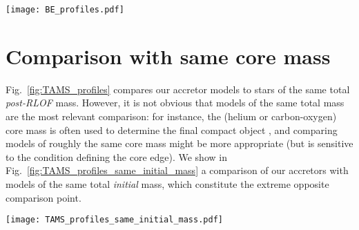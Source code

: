 \documentclass[twocolumn,twocolappendix,trackchanges]{aastex63}
\DeclareRobustCommand{\Figref}[1]{Fig.~\ref{#1}}
\begin{document}
\begin{figure*}[hbtp]
  \texttt{[image: BE\_profiles.pdf]}
  \caption{Binding energy profile at fixed photospheric radius $R$
    (right y-axis) as a function of radial coordinate $r$. We only
    show profiles with $\alpha_\mathrm{th}=1$, that is accounting for
    the internal energy content of the star. Orange, red, and other
    colors show respectively the accretor models, single stars of same
    post-RLOF total mass, and engineered models with varying CEB
    steepness (increasing CEB size from blue to
      yellow, cf.~\Figref{fig:TAMS_profiles}). Titles indicates the pre-RLOF and approximate
    post-RLOF accretor masses. The vertical colored lines mark the
    outer edge of the helium cores of the accretor and single star,
    that is the outermost location where $Y>0.1$ and $X<0.01$ (solid
    lines), or $X<0.1$ (dashed), or $X<0.2$ (dot-dashed). The dotted
    gray lines mark the total radius $R$ of these models.}
  \label{fig:BE_profiles}
\end{figure*}


\newpage
\section{Comparison with same core mass}
\label{sec:same_core}

\Figref{fig:TAMS_profiles} compares our accretor models to stars of
the same total \emph{post-RLOF} mass. However, it is not obvious that models
of the same total mass are the most relevant comparison: for instance,
the (helium or carbon-oxygen) core mass is often used to determine the
final compact object \citep[e.g.,][]{fryer:2012, farmer:2019,
  patton:2020, renzo:2022, fryer:2022}, and comparing models of
roughly the same core mass might be more appropriate (but is sensitive
to the condition defining the core edge). We show in
\Figref{fig:TAMS_profiles_same_initial_mass} a comparison of our
accretors with models of the same total \emph{initial} mass, which
constitute the extreme opposite comparison point.


\begin{figure*}[htbp]
  \centering
  \texttt{[image: TAMS\_profiles\_same\_initial\_mass.pdf]}
  \caption{Specific entropy (top row), H (bottom row, solid lines),
    and He (bottom row, dashed lines) profiles for non-rotating single
    stars (red), accretors (orange), and ``engineered'' models of the
    same total mass as the ZAMS mass of the accretors. The overlapping
    gray bands emphasize the CEB region, increasing
      in size from blue to yellow in the engineered models.}
  \label{fig:TAMS_profiles_same_initial_mass}
\end{figure*}
\end{document}
